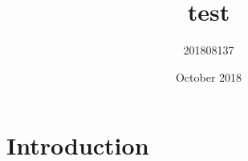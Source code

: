 \documentclass{article}
\title{test}
\author{201808137 }
\date{October 2018}
\begin{document}
\maketitle

\section{Introduction}
\end{document}
